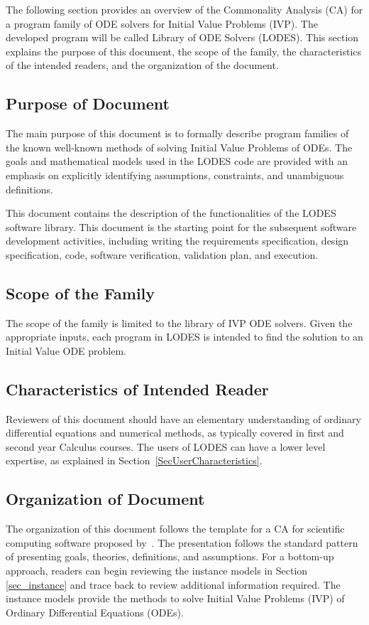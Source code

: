\documentclass[12pt]{article}
\newcommand{\famname}{LODES} %
\newcommand{\famdesc}{Library of ODE Solvers}
\begin{document}
The following section provides an overview of the Commonality Analysis (CA) for a
program family of ODE solvers for Initial Value Problems (IVP). The developed program will be
called \famdesc{} (\famname{}). This section explains the purpose of this
document, the scope of the family, the characteristics of the intended readers,
and the organization of the document.

\subsection{Purpose of Document}
The main purpose of this document is to formally describe program families of
the known well-known methods of solving Initial Value Problems of ODEs.
The goals and mathematical models used in the \famname{} code are provided with
an emphasis on explicitly identifying assumptions, constraints, and unambiguous definitions.

This document contains the description of the functionalities of the \famname{} software
library. This document is the starting point for the subsequent software development
activities, including writing the requirements specification, design specification, code,
software verification, validation plan, and execution.

\subsection{Scope of the Family}
The scope of the family is limited to the library of IVP ODE solvers. Given
the appropriate inputs, each program in \famname{} is intended to find the solution to an
Initial Value ODE problem.

\subsection{Characteristics of Intended Reader}
Reviewers of this document should have an elementary understanding of ordinary differential
equations and numerical methods, as typically covered in first and second year Calculus courses.
The users of \famname{} can have a lower level expertise, as explained in
Section~\ref{SecUserCharacteristics}.

\subsection{Organization of Document}
The organization of this document follows the template for a CA for scientific
computing software proposed by~\cite{Smith2006}. The presentation follows the standard
pattern of presenting goals, theories, definitions, and assumptions.
For a bottom-up approach, readers can begin reviewing the instance models in
Section \ref{sec_instance} and trace back to review additional information required.
The instance models provide the methods to solve Initial Value Problems (IVP)
of Ordinary Differential Equations (ODEs).
\end{document}
